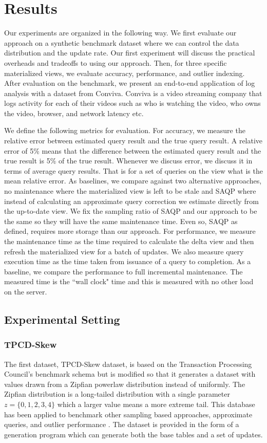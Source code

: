 \section{Results}
\label{exp}
Our experiments are organized in the following way.
We first evaluate our approach on a synthetic benchmark dataset where we can control the data distribution and the update rate.
Our first experiment will discuss the practical overheads and tradeoffs to using our approach.
Then, for three specific materialized views, we evaluate accuracy, performance, and outlier indexing.
After evaluation on the benchmark, we present an end-to-end application of log analysis with a dataset from Conviva.
Conviva is a video streaming company that logs activity for each of their videos such as who is watching the video, who owns the video, browser, and network latency etc. 

We define the following metrics for evaluation.
For accuracy, we measure the relative error between estimated query result and the true query result.
A relative error of 5\% means that the difference between the estimated query result and the true result is 5\% of the true result.
Whenever we discuss error, we discuss it in terms of average query results. 
That is for a set of queries on the view what is the mean relative error. 
As baselines, we compare against two alternative approaches, no maintenance where the materialized view is left to be stale and SAQP where instead 
of calculating an approximate query correction we estimate directly from the up-to-date view.
We fix the sampling ratio of SAQP and our approach to be the same so they will have the same maintenance time.
Even so, SAQP as defined, requires more storage than our approach.
For performance, we measure the maintenance time as the time required to calculate the delta view and then refresh the materialized view for a batch of updates.
We also measure query execution time as the time taken from issuance of a query to completion.
As a baseline, we compare the performance to full incremental maintenance.
The measured time is the ``wall clock" time and this is measured with no other load on the server.

\subsection{Experimental Setting}
\subsubsection{TPCD-Skew}
The first dataset, TPCD-Skew dataset, is based on the Transaction Processing Council's benchmark
schema but is modified so that it generates a dataset with values drawn from a Zipfian powerlaw distribution instead of uniformly.
The Zipfian distribution \cite{mitzenmacher2004brief} is a long-tailed distribution with a single parameter $z=\{0,1,2,3,4\}$ which a larger
value means a more extreme tail.
This database has been applied to benchmark other sampling based approaches, approximate queries, and outlier performance \cite{bruno2005flexible,chaudhuri2001overcoming, agrawal2005database, cuzzocrea2006improving}.
The dataset is provided in the form of a generation program which can generate both the base tables and a set of updates.

